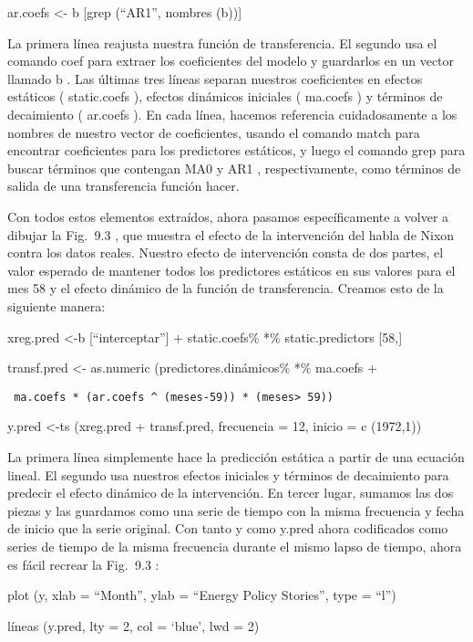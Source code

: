 \documentclass[
]{book}
\begin{document}
ar.coefs \textless- b {[}grep (``AR1'', nombres (b)){]}

La primera línea reajusta nuestra función de transferencia. El segundo usa el comando coef para extraer los coeficientes del modelo y guardarlos en un vector llamado b . Las últimas tres líneas separan nuestros coeficientes en efectos estáticos ( static.coefs ), efectos dinámicos iniciales ( ma.coefs ) y términos de decaimiento ( ar.coefs ). En cada línea, hacemos referencia cuidadosamente a los nombres de nuestro vector de coeficientes, usando el comando match para encontrar coeficientes para los predictores estáticos, y luego el comando grep para buscar términos que contengan MA0 y AR1 , respectivamente, como términos de salida de una transferencia función hacer.

Con todos estos elementos extraídos, ahora pasamos específicamente a volver a dibujar la Fig.  9.3 , que muestra el efecto de la intervención del habla de Nixon contra los datos reales. Nuestro efecto de intervención consta de dos partes, el valor esperado de mantener todos los predictores estáticos en sus valores para el mes 58 y el efecto dinámico de la función de transferencia. Creamos esto de la siguiente manera:

xreg.pred \textless-b {[}``interceptar''{]} + static.coefs\% *\% static.predictors {[}58,{]}

transf.pred \textless- as.numeric (predictores.dinámicos\% *\% ma.coefs +

\begin{verbatim}
 ma.coefs * (ar.coefs ^ (meses-59)) * (meses> 59))
\end{verbatim}

y.pred \textless-ts (xreg.pred + transf.pred, frecuencia = 12, inicio = c (1972,1))

La primera línea simplemente hace la predicción estática a partir de una ecuación lineal. El segundo usa nuestros efectos iniciales y términos de decaimiento para predecir el efecto dinámico de la intervención. En tercer lugar, sumamos las dos piezas y las guardamos como una serie de tiempo con la misma frecuencia y fecha de inicio que la serie original. Con tanto y como y.pred ahora codificados como series de tiempo de la misma frecuencia durante el mismo lapso de tiempo, ahora es fácil recrear la Fig.  9.3 :

plot (y, xlab = ``Month'', ylab = ``Energy Policy Stories'', type = ``l'')

líneas (y.pred, lty = 2, col = `blue', lwd = 2)
\end{document}
